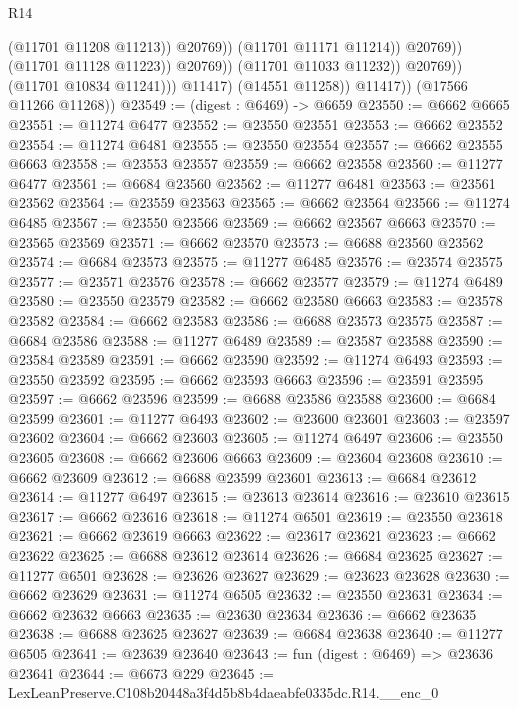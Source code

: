 \begin{lexlean}{R14}
\begin{coremodule}
                                          (@11701 @11208 @11213))
                                        @20769))
                                    (@11701 @11171 @11214))
                                  @20769))
                              (@11701 @11128 @11223))
                            @20769))
                        (@11701 @11033 @11232))
                      @20769))
                  (@11701 @10834 @11241)))
              @11417)
            (@14551 @11258))
          @11417))
      (@17566 @11266 @11268))
@23549 := (digest : @6469) -> @6659
@23550 := @6662 @6665
@23551 := @11274 @6477
@23552 := @23550 @23551
@23553 := @6662 @23552
@23554 := @11274 @6481
@23555 := @23550 @23554
@23557 := @6662 @23555 @6663
@23558 := @23553 @23557
@23559 := @6662 @23558
@23560 := @11277 @6477
@23561 := @6684 @23560
@23562 := @11277 @6481
@23563 := @23561 @23562
@23564 := @23559 @23563
@23565 := @6662 @23564
@23566 := @11274 @6485
@23567 := @23550 @23566
@23569 := @6662 @23567 @6663
@23570 := @23565 @23569
@23571 := @6662 @23570
@23573 := @6688 @23560 @23562
@23574 := @6684 @23573
@23575 := @11277 @6485
@23576 := @23574 @23575
@23577 := @23571 @23576
@23578 := @6662 @23577
@23579 := @11274 @6489
@23580 := @23550 @23579
@23582 := @6662 @23580 @6663
@23583 := @23578 @23582
@23584 := @6662 @23583
@23586 := @6688 @23573 @23575
@23587 := @6684 @23586
@23588 := @11277 @6489
@23589 := @23587 @23588
@23590 := @23584 @23589
@23591 := @6662 @23590
@23592 := @11274 @6493
@23593 := @23550 @23592
@23595 := @6662 @23593 @6663
@23596 := @23591 @23595
@23597 := @6662 @23596
@23599 := @6688 @23586 @23588
@23600 := @6684 @23599
@23601 := @11277 @6493
@23602 := @23600 @23601
@23603 := @23597 @23602
@23604 := @6662 @23603
@23605 := @11274 @6497
@23606 := @23550 @23605
@23608 := @6662 @23606 @6663
@23609 := @23604 @23608
@23610 := @6662 @23609
@23612 := @6688 @23599 @23601
@23613 := @6684 @23612
@23614 := @11277 @6497
@23615 := @23613 @23614
@23616 := @23610 @23615
@23617 := @6662 @23616
@23618 := @11274 @6501
@23619 := @23550 @23618
@23621 := @6662 @23619 @6663
@23622 := @23617 @23621
@23623 := @6662 @23622
@23625 := @6688 @23612 @23614
@23626 := @6684 @23625
@23627 := @11277 @6501
@23628 := @23626 @23627
@23629 := @23623 @23628
@23630 := @6662 @23629
@23631 := @11274 @6505
@23632 := @23550 @23631
@23634 := @6662 @23632 @6663
@23635 := @23630 @23634
@23636 := @6662 @23635
@23638 := @6688 @23625 @23627
@23639 := @6684 @23638
@23640 := @11277 @6505
@23641 := @23639 @23640
@23643 := fun (digest : @6469) => @23636 @23641
@23644 := @6673 @229
@23645 := LexLeanPreserve.C108b20448a3f4d5b8b4daeabfe0335dc.R14.__enc_0

\end{coremodule}
\end{lexlean}
